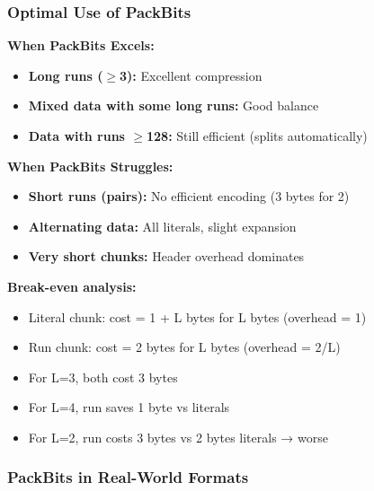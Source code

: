 \subsubsection{Optimal Use of PackBits}

\begin{importantbox}
\textbf{When PackBits Excels:}

\begin{itemize}
    \item \textbf{Long runs ($\geq$3):} Excellent compression
    \item \textbf{Mixed data with some long runs:} Good balance
    \item \textbf{Data with runs $\geq$128:} Still efficient (splits automatically)
\end{itemize}

\textbf{When PackBits Struggles:}

\begin{itemize}
    \item \textbf{Short runs (pairs):} No efficient encoding (3 bytes for 2)
    \item \textbf{Alternating data:} All literals, slight expansion
    \item \textbf{Very short chunks:} Header overhead dominates
\end{itemize}

\textbf{Break-even analysis:}
\begin{itemize}
    \item Literal chunk: cost = 1 + L bytes for L bytes (overhead = 1)
    \item Run chunk: cost = 2 bytes for L bytes (overhead = 2/L)
    \item For L=3, both cost 3 bytes
    \item For L=4, run saves 1 byte vs literals
    \item For L=2, run costs 3 bytes vs 2 bytes literals → worse
\end{itemize}
\end{importantbox}

\subsubsection{PackBits in Real-World Formats}

